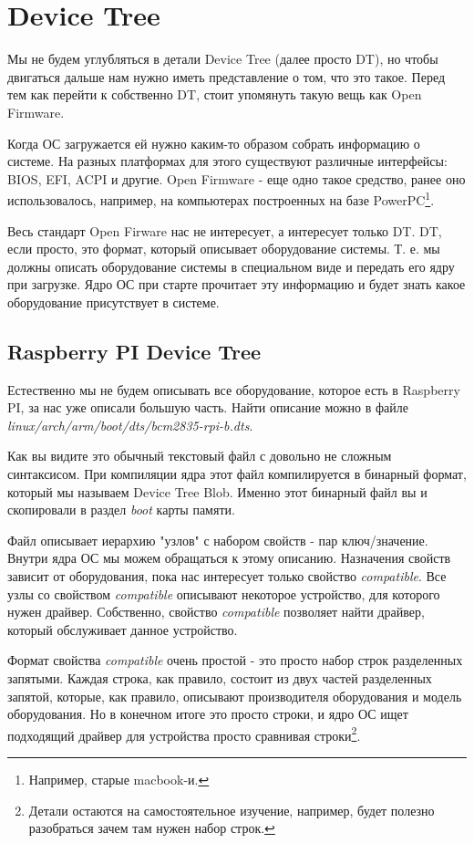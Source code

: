 \section{Device Tree}

Мы не будем углубляться в детали Device Tree (далее просто DT), но чтобы
двигаться дальше нам нужно иметь представление о том, что это такое. Перед тем
как перейти к собственно DT, стоит упомянуть такую вещь как Open Firmware.

Когда ОС загружается ей нужно каким-то образом собрать информацию о системе.
На разных платформах для этого существуют различные интерфейсы: BIOS, EFI, ACPI
и другие. Open Firmware - еще одно такое средство, ранее оно использовалось,
например, на компьютерах построенных на базе PowerPC\footnote{Например, старые
macbook-и.}.

Весь стандарт Open Firware нас не интересует, а интересует только DT. DT, если
просто, это формат, который описывает оборудование системы. Т. е. мы должны
описать оборудование системы в специальном виде и передать его ядру при
загрузке. Ядро ОС при старте прочитает эту информацию и будет знать какое
оборудование присутствует в системе.

\subsection{Raspberry PI Device Tree}

Естественно мы не будем описывать все оборудование, которое есть в Raspberry PI,
за нас уже описали большую часть. Найти описание можно в файле
\emph{linux/arch/arm/boot/dts/bcm2835-rpi-b.dts}.

Как вы видите это обычный текстовый файл с довольно не сложным синтаксисом. При
компиляции ядра этот файл компилируется в бинарный формат, который мы называем
Device Tree Blob. Именно этот бинарный файл вы и скопировали в раздел
\emph{boot} карты памяти.

Файл описывает иерархию "узлов" с набором свойств - пар ключ/значение. Внутри
ядра ОС мы можем обращаться к этому описанию. Назначения свойств зависит от
оборудования, пока нас интересует только свойство \emph{compatible}. Все
узлы со свойством \emph{compatible} описывают некоторое устройство, для которого
нужен драйвер. Собственно, свойство \emph{compatible} позволяет найти драйвер,
который обслуживает данное устройство.

Формат свойства \emph{compatible} очень простой - это просто набор строк
разделенных запятыми. Каждая строка, как правило, состоит из двух частей
разделенных запятой, которые, как правило, описывают производителя оборудования
и модель оборудования. Но в конечном итоге это просто строки, и ядро ОС ищет
подходящий драйвер для устройства просто сравнивая строки\footnote{Детали
остаются на самостоятельное изучение, например, будет полезно разобраться зачем
там нужен набор строк.}.

